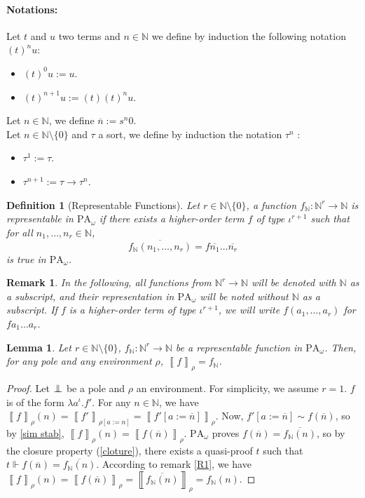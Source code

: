 \documentclass[a4paper,12pt]{article}
\newtheorem{defi}[theo]{Definition}
\newtheorem{lem}[theo]{Lemma}
\theoremstyle{rmqstyle}
\newtheorem{rmq}[theo]{Remark}
\newcommand{\N}{\mathbb{N}}
\newcommand{\set}[1]{\{#1\}}
\newcommand{\itp}[1]{\left\llbracket#1\right\rrbracket}
\newcommand{\PA}{\mathrm{PA}}
\newcommand{\pole}{{\protect\mathpalette{\protect\polehelper}{\bot}}} \def\polehelper#1#2{\mathrel{\rlap{$#1#2$}\mkern3mu{#1#2}}}
\renewcommand{\bar}{\overline}
\begin{document}
\paragraph{Notations:} Let $t$ and $u$ two terms and $n \in \N$ we define by induction the following notation $(t)^n u$:
\begin{itemize}
\setlength\itemsep{ -1 em}
\item $(t)^0 u := u$.\\
\item $(t)^{n +1} u := (t)(t)^nu$.
\end{itemize}
Let $n \in \N$, we define $\bar{n} := s^{n}0$.\\
Let $n \in \N \setminus \set{0}$ and $\tau$ a sort, we define by induction the notation $\tau^n$ :
\begin{itemize}
\setlength\itemsep{ -1 em}
\item $\tau^1 := \tau$.\\
\item $\tau^{n +1} := \tau \to \tau^n$.
\end{itemize}

\begin{defi}[Representable Functions]
Let $r \in \N \setminus \set{0}$, a function $f_\N: \N^r \to \N$ is representable in $\PA_\omega$ if there exists a higher-order term $f$ of type $\iota^{r+1}$ such that for all $n_1, \dots, n_r \in \N$,
$$\bar{f_\N(n_1, \dots, n_r)} = f \bar{n_1} \dots \bar{n_r}$$
is true in $\PA_\omega$.
\end{defi}

\begin{rmq}
In the following, all functions from $\N^r \to \N$ will be denoted with $\N$ as a subscript, and their representation in $\PA_\omega$ will be noted without $\N$ as a subscript. If $f$ is a higher-order term of type $\iota^{r+1}$, we will write $f(a_1, \dots, a_r)$ for $f a_1 \dots a_r$.
\end{rmq}

\begin{lem}
\label{egal itp rep}
Let $r \in \N \setminus \set{0}$, $f_\N : \N^r \to \N$ be a representable function in $\PA_\omega$. Then, for any pole and any environment $\rho$, $\itp{f}_\rho = f_\N$.
\end{lem}

\begin{proof}
Let $\pole$ be a pole and $\rho$ an environment. For simplicity, we assume $r = 1$. $f$ is of the form $\lambda a^\iota. f'$. For any $n \in \N$, we have $\itp{f}_\rho(n) = \itp{f'}_{\rho[a := n]} = \itp{f'[a := \bar{n}]}_\rho$. Now, $f'[a := \bar{n}] \sim f(\bar{n})$, so by \ref{sim stab}, $\itp{f}_\rho(n) = \itp{f(\bar{n})}_\rho$. $\PA_\omega$ proves $f(\bar{n}) = \bar{f_\N(n)}$, so by the closure property (\ref{cloture}), there exists a quasi-proof $t$ such that $t \Vdash f(\bar{n}) = \bar{f_\N(n)}$. According to remark \ref{R1}, we have $\itp{f}_\rho(n) = \itp{f(\bar{n})}_\rho = \itp{\bar{f_\N(n)}}_\rho = f_\N(n)$.
\end{proof}
\end{document}
